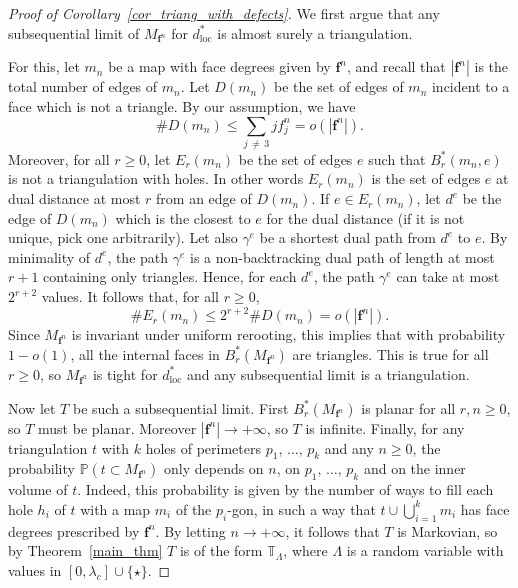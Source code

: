 \documentclass[10pt]{amsart}
\theoremstyle{definition}\newtheorem{defi}[theo]{Definition}\newtheorem{rema}[theo]{Remark}\newtheorem{exam}[theo]{Example}\newtheorem{exem}[theo]{Example}\newtheorem{nota}[theo]{Notation}
\newcommand{\loc}{\mathrm{loc}}
\newcommand{\TT}{\mathbb{T}}
\renewcommand{\P}{\mathbb{P}}
\newcommand{\bff}{\mathbf{f}}
\begin{document}
\begin{proof}[Proof of Corollary~\ref{cor_triang_with_defects}]
We first argue that any subsequential limit of $M_{\bff^n}$ for $d_{\loc}^*$ is almost surely a triangulation.

For this, let $m_n$ be a map with face degrees given by $\bff^n$, and recall that $|\bff^n|$ is the total number of edges of $m_n$. Let $D(m_n)$ be the set of edges of $m_n$ incident to a face which is not a triangle. By our assumption, we have
\[
\# D(m_n) \leq \sum_{j\,\ne\,3} j f_j^n = o \left(\left|\bff^n\right| \right).
\]
Moreover, for all $r \geq 0$, let $E_r(m_n)$ be the set of edges $e$ such that $B_r^*(m_n,e)$ is not a triangulation with holes. In other words $E_r(m_n)$ is the set of edges $e$ at dual distance at most $r$ from an edge of $D(m_n)$. If $e \in E_r(m_n)$, let $d^e$ be the edge of $D(m_n)$ which is the closest to $e$ for the dual distance (if it is not unique, pick one arbitrarily). Let also $\gamma^e$ be a shortest dual path from $d^e$ to $e$. By minimality of $d^e$, the path $\gamma^e$ is a non-backtracking dual path of length at most $r+1$ containing only triangles. Hence, for each $d^e$, the path $\gamma^e$ can take at most $2^{r+2}$ values. It follows that, for all $r \geq 0$,
\[
\# E_r(m_n) \leq 2^{r+2} \# D(m_n) = o \left(\left|\bff^n\right| \right).
\]
Since $M_{\bff^n}$ is invariant under uniform rerooting, this implies that with probability $1-o(1)$, all the internal faces in $B_r^* (M_{\bff^n})$ are triangles. This is true for all $r \geq 0$, so $M_{\bff^n}$ is tight for $d_{\loc}^*$ and any subsequential limit is a triangulation.

Now let $T$ be such a subsequential limit. First $B_r^* (M_{\bff^n})$ is planar for all $r,n \geq 0$, so $T$ must be planar. Moreover $|\bff^n| \to +\infty$, so $T$ is infinite. Finally, for any triangulation $t$ with $k$ holes of perimeters $p_1,\,\dots,\,p_k$ and any $n \geq 0$, the probability $\P (t \subset M_{\bff^n})$ only depends on $n$, on $p_1,\,\dots,\,p_k$ and on the inner volume of $t$. Indeed, this probability is given by the number of ways to fill each hole $h_i$ of $t$ with a map $m_i$ of the $p_i$-gon, in such a way that $t \cup \bigcup_{i=1}^k m_i$ has face degrees prescribed by $\bff^n$. By letting $n \to +\infty$, it follows that $T$ is Markovian, so by Theorem~\ref{main_thm} $T$ is of the form $\TT_{\Lambda}$, where $\Lambda$ is a random variable with values in $[0,\lambda_c] \cup \{ \star \}$.


\end{proof}
\end{document}
